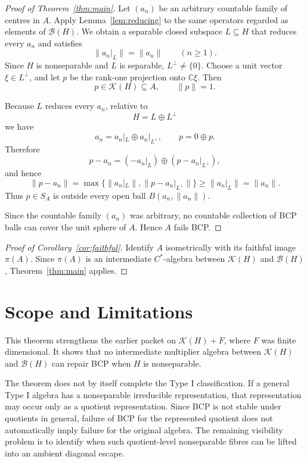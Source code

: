 \documentclass[11pt]{article}
\newcommand{\Kcal}{\mathcal K}
\newcommand{\Bcal}{\mathcal B}
\newcommand{\C}{\mathbb C}
\begin{document}
\begin{proof}[Proof of Theorem~\ref{thm:main}]
Let \((a_n)\) be an arbitrary countable family of centres in \(A\).  Apply
Lemma~\ref{lem:reducing} to the same operators regarded as elements of
\(\Bcal(H)\).  We obtain a separable closed subspace \(L\subseteq H\) that
reduces every \(a_n\) and satisfies
\[
        \|a_n|_L\|=\|a_n\|
        \qquad(n\ge1).
\]
Since \(H\) is nonseparable and \(L\) is separable, \(L^\perp\ne\{0\}\).
Choose a unit vector \(\xi\in L^\perp\), and let \(p\) be the rank-one
projection onto \(\C\xi\).  Then
\[
        p\in \Kcal(H)\subseteq A,
        \qquad
        \|p\|=1.
\]

Because \(L\) reduces every \(a_n\), relative to
\[
        H=L\oplus L^\perp
\]
we have
\[
        a_n=a_n|_L\oplus a_n|_{L^\perp},
        \qquad
        p=0\oplus p.
\]
Therefore
\[
        p-a_n=(-a_n|_L)\oplus(p-a_n|_{L^\perp}),
\]
and hence
\[
        \|p-a_n\|
        =
        \max\{\|a_n|_L\|,\|p-a_n|_{L^\perp}\|\}
        \ge
        \|a_n|_L\|
        =
        \|a_n\|.
\]
Thus \(p\in S_A\) is outside every open ball \(B(a_n,\|a_n\|)\).

Since the countable family \((a_n)\) was arbitrary, no countable collection of
BCP balls can cover the unit sphere of \(A\).  Hence \(A\) fails BCP.
\end{proof}

\begin{proof}[Proof of Corollary~\ref{cor:faithful}]
Identify \(A\) isometrically with its faithful image \(\pi(A)\).  Since
\(\pi(A)\) is an intermediate \(C^*\)-algebra between \(\Kcal(H)\) and
\(\Bcal(H)\), Theorem~\ref{thm:main} applies.
\end{proof}

\section*{Scope and Limitations}

This theorem strengthens the earlier packet on
\(\Kcal(H)+F\), where \(F\) was finite dimensional.  It shows that no
intermediate multiplier algebra between \(\Kcal(H)\) and \(\Bcal(H)\) can
repair BCP when \(H\) is nonseparable.

The theorem does not by itself complete the Type I classification.  If a
general Type I algebra has a nonseparable irreducible representation, that
representation may occur only as a quotient representation.  Since BCP is not
stable under quotients in general, failure of BCP for the represented quotient
does not automatically imply failure for the original algebra.  The remaining
visibility problem is to identify when such quotient-level nonseparable
fibres can be lifted into an ambient diagonal escape.
\end{document}
